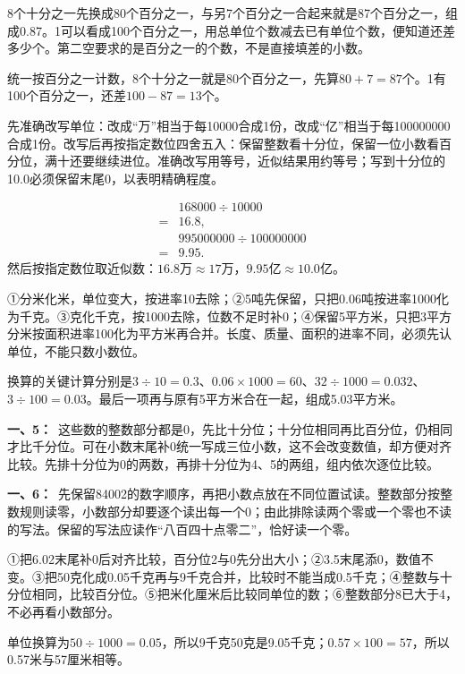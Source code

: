 \documentclass[multi=snippet,border=0pt]{standalone}
\newenvironment{snippet}[3]{\begin{minipage}{#1bp}\color{answerred}\fontsize{#2}{#3}\selectfont\raggedright}{\end{minipage}}
\begin{document}
\begin{snippet}{505}{11.5}{14}8个十分之一先换成80个百分之一，与另7个百分之一合起来就是87个百分之一，组成0.87。1可以看成100个百分之一，用总单位个数减去已有单位个数，便知道还差多少个。第二空要求的是百分之一的个数，不是直接填差的小数。\par 统一按百分之一计数，8个十分之一就是80个百分之一，先算\(80+7=87\)个。1有100个百分之一，还差\(100-87=13\)个。\end{snippet}
\begin{snippet}{505}{11.5}{14}先准确改写单位：改成“万”相当于每10000合成1份，改成“亿”相当于每100000000合成1份。改写后再按指定数位四舍五入：保留整数看十分位，保留一位小数看百分位，满十还要继续进位。准确改写用等号，近似结果用约等号；写到十分位的10.0必须保留末尾0，以表明精确程度。\par \[\begin{aligned}&168000\div10000\\={}&16.8,\\&995000000\div100000000\\={}&9.95.\end{aligned}\]然后按指定数位取近似数：\(16.8\text{万}\approx17\text{万}\)，\(9.95\text{亿}\approx10.0\text{亿}\)。\end{snippet}
\begin{snippet}{505}{11.5}{14}①分米化米，单位变大，按进率10去除；②5吨先保留，只把0.06吨按进率1000化为千克。③克化千克，按1000去除，位数不足时补0；④保留5平方米，只把3平方分米按面积进率100化为平方米再合并。长度、质量、面积的进率不同，必须先认单位，不能只数小数位。\par 换算的关键计算分别是\(3\div10=0.3\)、\(0.06\times1000=60\)、\(32\div1000=0.032\)、\(3\div100=0.03\)。最后一项再与原有5平方米合在一起，组成5.03平方米。\end{snippet}
\begin{snippet}{505}{11.5}{14}\textbf{一、5：}\ 这些数的整数部分都是0，先比十分位；十分位相同再比百分位，仍相同才比千分位。可在小数末尾补0统一写成三位小数，这不会改变数值，却方便对齐比较。先排十分位为0的两数，再排十分位为4、5的两组，组内依次逐位比较。\end{snippet}
\begin{snippet}{505}{11.5}{14}\textbf{一、6：}\ 先保留84002的数字顺序，再把小数点放在不同位置试读。整数部分按整数规则读零，小数部分却要逐个读出每一个0；由此排除读两个零或一个零也不读的写法。保留的写法应读作“八百四十点零二”，恰好读一个零。\end{snippet}
\begin{snippet}{505}{11.5}{14}①把6.02末尾补0后对齐比较，百分位2与0先分出大小；②3.5末尾添0，数值不变。③把50克化成0.05千克再与9千克合并，比较时不能当成0.5千克；④整数与十分位相同，比较百分位。⑤把米化厘米后比较同单位的数；⑥整数部分8已大于4，不必再看小数部分。\par 单位换算为\(50\div1000=0.05\)，所以9千克50克是9.05千克；\(0.57\times100=57\)，所以0.57米与57厘米相等。\end{snippet}
\end{document}
